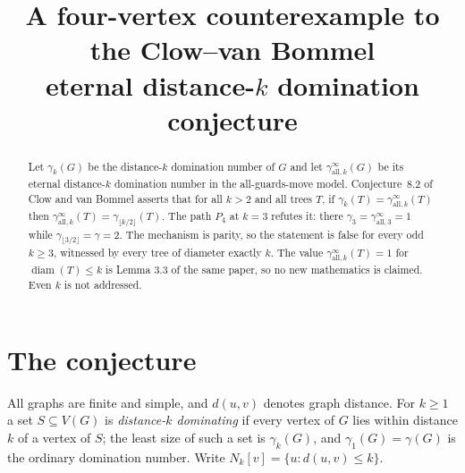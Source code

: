 \documentclass[11pt]{amsart}
\begin{document}
\title[A four-vertex counterexample]
{A four-vertex counterexample to the Clow--van Bommel\\
 eternal distance-$k$ domination conjecture}

\date{}


\begin{abstract}
Let $\gamma_k(G)$ be the distance-$k$ domination number of $G$ and let
$\gamma_{\mathrm{all},k}^{\infty}(G)$ be its eternal distance-$k$ domination
number in the all-guards-move model. Conjecture~8.2 of Clow and van Bommel
asserts that for all $k>2$ and all trees $T$, if
$\gamma_k(T)=\gamma_{\mathrm{all},k}^{\infty}(T)$ then
$\gamma_{\mathrm{all},k}^{\infty}(T)=\gamma_{\lfloor k/2\rfloor}(T)$.
The path $P_4$ at $k=3$ refutes it: there
$\gamma_3=\gamma_{\mathrm{all},3}^{\infty}=1$ while
$\gamma_{\lfloor 3/2\rfloor}=\gamma=2$. The mechanism is parity, so the
statement is false for every odd $k\ge3$, witnessed by every tree of diameter
exactly $k$. The value $\gamma_{\mathrm{all},k}^{\infty}(T)=1$ for
$\operatorname{diam}(T)\le k$ is Lemma 3.3 of the same paper, so no new
mathematics is claimed. Even $k$ is not addressed.
\end{abstract}

\maketitle

\section{The conjecture}

All graphs are finite and simple, and $d(u,v)$ denotes graph distance. For
$k\ge1$ a set $S\subseteq V(G)$ is \emph{distance-$k$ dominating} if every
vertex of $G$ lies within distance $k$ of a vertex of $S$; the least size of
such a set is $\gamma_k(G)$, and $\gamma_1(G)=\gamma(G)$ is the ordinary
domination number. Write $N_k[v]=\{u: d(u,v)\le k\}$.
\end{document}
